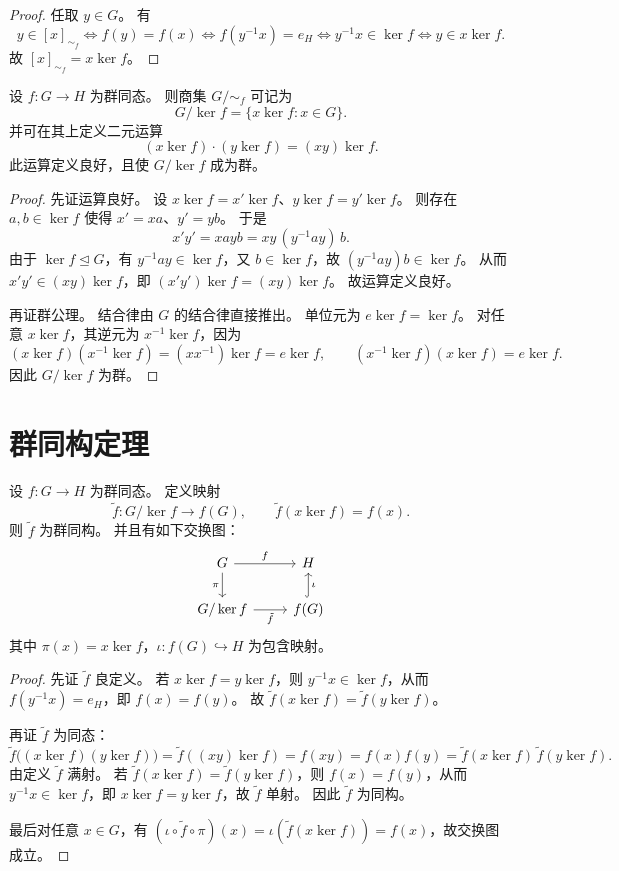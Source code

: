 \documentclass[lang=cn,a4paper,newtx]{elegantbook}
\begin{document}
\begin{proof}
任取 $y\in G$。
有
\[
  y\in [x]_{\sim_f}\iff f(y)=f(x)\iff f(y^{-1}x)=e_H\iff y^{-1}x\in \ker f\iff y\in x\ker f.
\]
故 $[x]_{\sim_f}=x\ker f$。
\end{proof}

\begin{proposition}[商群 $G/\ker f$]
设 $f:G\to H$ 为群同态。
则商集 $G/\!\sim_f$ 可记为
\[
  G/\ker f=\{x\ker f:x\in G\}.
\]
并可在其上定义二元运算
\[
  (x\ker f)\cdot (y\ker f)=(xy)\ker f.
\]
此运算定义良好，且使 $G/\ker f$ 成为群。
\end{proposition}

\begin{proof}
先证运算良好。
设 $x\ker f=x'\ker f$、$y\ker f=y'\ker f$。
则存在 $a,b\in \ker f$ 使得 $x'=xa$、$y'=yb$。
于是
\[
  x'y'=xayb=xy\,(y^{-1}ay)\,b.
\]
由于 $\ker f\trianglelefteq G$，有 $y^{-1}ay\in \ker f$，又 $b\in \ker f$，故 $(y^{-1}ay)b\in \ker f$。
从而 $x'y'\in (xy)\ker f$，即 $(x'y')\ker f=(xy)\ker f$。
故运算定义良好。

再证群公理。
结合律由 $G$ 的结合律直接推出。
单位元为 $e\ker f=\ker f$。
对任意 $x\ker f$，其逆元为 $x^{-1}\ker f$，因为
\[
  (x\ker f)(x^{-1}\ker f)=(xx^{-1})\ker f=e\ker f,\qquad (x^{-1}\ker f)(x\ker f)=e\ker f.
\]
因此 $G/\ker f$ 为群。
\end{proof}

\section{群同构定理}

\begin{proposition}
设 $f:G\to H$ 为群同态。
定义映射
\[
  \tilde f:G/\ker f\to f(G),\qquad \tilde f(x\ker f)=f(x).
\]
则 $\tilde f$ 为群同构。
并且有如下交换图：
\[
\begin{tikzcd}
 G \arrow[r,"f"] \arrow[d,"\pi"'] & H \\
 G/\ker f \arrow[r,"\tilde f"'] & f(G) \arrow[u,hook,"\iota"']
\end{tikzcd}
\]
其中 $\pi(x)=x\ker f$，$\iota:f(G)\hookrightarrow H$ 为包含映射。
\end{proposition}

\begin{proof}
先证 $\tilde f$ 良定义。
若 $x\ker f=y\ker f$，则 $y^{-1}x\in \ker f$，从而 $f(y^{-1}x)=e_H$，即 $f(x)=f(y)$。
故 $\tilde f(x\ker f)=\tilde f(y\ker f)$。

再证 $\tilde f$ 为同态：
\[
  \tilde f\bigl((x\ker f)(y\ker f)\bigr)=\tilde f((xy)\ker f)=f(xy)=f(x)f(y)=\tilde f(x\ker f)\,\tilde f(y\ker f).
\]
由定义 $\tilde f$ 满射。
若 $\tilde f(x\ker f)=\tilde f(y\ker f)$，则 $f(x)=f(y)$，从而 $y^{-1}x\in \ker f$，即 $x\ker f=y\ker f$，故 $\tilde f$ 单射。
因此 $\tilde f$ 为同构。

最后对任意 $x\in G$，有 $(\iota\circ\tilde f\circ\pi)(x)=\iota(\tilde f(x\ker f))=f(x)$，故交换图成立。
\end{proof}
\end{document}
